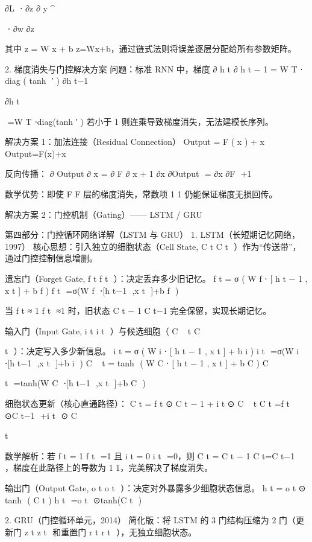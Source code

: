 ∂L
​
 ⋅ 
∂z
∂ 
y
^
​
 
​
 ⋅ 
∂w
∂z
​
 

其中 
z
=
W
x
+
b
z=Wx+b，通过链式法则将误差逐层分配给所有参数矩阵。

2. 梯度消失与门控解决方案
问题：标准 RNN 中，梯度 
∂
h
t
∂
h
t
−
1
=
W
T
⋅
diag
(
tanh
⁡
′
)
∂h 
t−1
​
 
∂h 
t
​
 
​
 =W 
T
 ⋅diag(tanh 
′
 ) 若小于 1 则连乘导致梯度消失，无法建模长序列。

解决方案 1：加法连接（Residual Connection）
Output
=
F
(
x
)
+
x
Output=F(x)+x

反向传播：
∂
Output
∂
x
=
∂
F
∂
x
+
1
∂x
∂Output
​
 = 
∂x
∂F
​
 +1

数学优势：即使 
F
F 层的梯度消失，常数项 
1
1 仍能保证梯度无损回传。

解决方案 2：门控机制（Gating）—— LSTM / GRU

第四部分：门控循环网络详解（LSTM 与 GRU）
1. LSTM（长短期记忆网络，1997）
核心思想：引入独立的细胞状态（Cell State, 
C
t
C 
t
​
 ）作为“传送带”，通过门控控制信息增删。

遗忘门（Forget Gate, 
f
t
f 
t
​
 ）：决定丢弃多少旧记忆。
f
t
=
σ
(
W
f
⋅
[
h
t
−
1
,
x
t
]
+
b
f
)
f 
t
​
 =σ(W 
f
​
 ⋅[h 
t−1
​
 ,x 
t
​
 ]+b 
f
​
 )

当 
f
t
≈
1
f 
t
​
 ≈1 时，旧状态 
C
t
−
1
C 
t−1
​
  完全保留，实现长期记忆。

输入门（Input Gate, 
i
t
i 
t
​
 ）与候选细胞（
C
~
t
C
~
  
t
​
 ）：决定写入多少新信息。
i
t
=
σ
(
W
i
⋅
[
h
t
−
1
,
x
t
]
+
b
i
)
i 
t
​
 =σ(W 
i
​
 ⋅[h 
t−1
​
 ,x 
t
​
 ]+b 
i
​
 )
C
~
t
=
tanh
⁡
(
W
C
⋅
[
h
t
−
1
,
x
t
]
+
b
C
)
C
~
  
t
​
 =tanh(W 
C
​
 ⋅[h 
t−1
​
 ,x 
t
​
 ]+b 
C
​
 )

细胞状态更新（核心直通路径）：
C
t
=
f
t
⊙
C
t
−
1
+
i
t
⊙
C
~
t
C 
t
​
 =f 
t
​
 ⊙C 
t−1
​
 +i 
t
​
 ⊙ 
C
~
  
t
​
 

数学解析：若 
f
t
=
1
f 
t
​
 =1 且 
i
t
=
0
i 
t
​
 =0，则 
C
t
=
C
t
−
1
C 
t
​
 =C 
t−1
​
 ，梯度在此路径上的导数为 
1
1，完美解决了梯度消失。

输出门（Output Gate, 
o
t
o 
t
​
 ）：决定对外暴露多少细胞状态信息。
h
t
=
o
t
⊙
tanh
⁡
(
C
t
)
h 
t
​
 =o 
t
​
 ⊙tanh(C 
t
​
 )

2. GRU（门控循环单元，2014）
简化版：将 LSTM 的 3 门结构压缩为 2 门（更新门 
z
t
z 
t
​
  和重置门 
r
t
r 
t
​
 ），无独立细胞状态。

